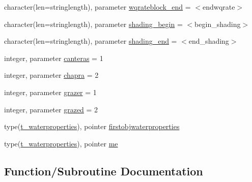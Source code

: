 \begin{DoxyCompactItemize}
\item 
character(len=stringlength), parameter \mbox{\hyperlink{namespacemodulewaterproperties_a475ba576901500320a60416bf37b02af}{wqrateblock\+\_\+end}} = \textquotesingle{}$<$endwqrate$>$\textquotesingle{}
\item 
character(len=stringlength), parameter \mbox{\hyperlink{namespacemodulewaterproperties_a51f1162211d338123e9ca464f61b794f}{shading\+\_\+begin}} = \textquotesingle{}$<$begin\+\_\+shading$>$\textquotesingle{}
\item 
character(len=stringlength), parameter \mbox{\hyperlink{namespacemodulewaterproperties_acc1f3c2ffa2d7ca6898633c3278f42f9}{shading\+\_\+end}} = \textquotesingle{}$<$end\+\_\+shading$>$\textquotesingle{}
\item 
integer, parameter \mbox{\hyperlink{namespacemodulewaterproperties_a3d943ea9e379be00013c408258074a74}{canteras}} = 1
\item 
integer, parameter \mbox{\hyperlink{namespacemodulewaterproperties_a45723a4d6bb04441fb778f26465d7fcc}{chapra}} = 2
\item 
integer, parameter \mbox{\hyperlink{namespacemodulewaterproperties_a3e35da380ab86aa705245e6d2a397bac}{grazer}} = 1
\item 
integer, parameter \mbox{\hyperlink{namespacemodulewaterproperties_ac58d0aa9a8e828393a35fe78e9a20048}{grazed}} = 2
\item 
type(\mbox{\hyperlink{structmodulewaterproperties_1_1t__waterproperties}{t\+\_\+waterproperties}}), pointer \mbox{\hyperlink{namespacemodulewaterproperties_a30f53fbac0d69722990af045f9fba578}{firstobjwaterproperties}}
\item 
type(\mbox{\hyperlink{structmodulewaterproperties_1_1t__waterproperties}{t\+\_\+waterproperties}}), pointer \mbox{\hyperlink{namespacemodulewaterproperties_abe019d24d7f8e105550a835095609fdb}{me}}
\end{DoxyCompactItemize}


\subsection{Function/\+Subroutine Documentation}
\mbox{\label{namespacemodulewaterproperties_afcd5345e3a92fad8129c23c999e18873}} 
